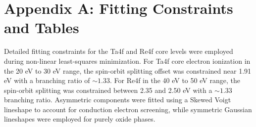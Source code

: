 \documentclass[12pt]{article}
\begin{document}
\section*{Appendix A: Fitting Constraints and Tables}
Detailed fitting constraints for the Ta4f and Re4f core levels were employed during non-linear least-squares minimization. For Ta4f core electron ionization in the 20 eV to 30 eV range, the spin-orbit splitting offset was constrained near 1.91 eV with a branching ratio of $\sim1.33$. For Re4f in the 40 eV to 50 eV range, the spin-orbit splitting was constrained between 2.35 and 2.50 eV with a $\sim1.33$ branching ratio. Asymmetric components were fitted using a Skewed Voigt lineshape to account for conduction electron screening, while symmetric Gaussian lineshapes were employed for purely oxide phases.

\end{document}
